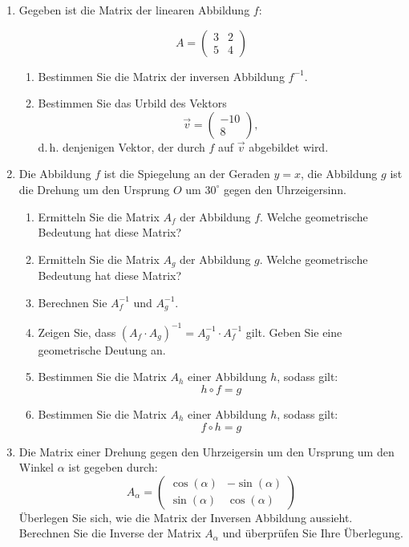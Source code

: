 \begin{ueb}
    {}{}
    \begin{enumerate}
        
    \item Gegeben ist die Matrix der linearen Abbildung \( f \):

    \[
    A = \begin{pmatrix}
    3 & 2 \\
    5 & 4
    \end{pmatrix}
    \]
    
    \begin{enumerate}
      \item Bestimmen Sie die Matrix der inversen Abbildung \( f^{-1} \).
      \item Bestimmen Sie das Urbild des Vektors 
      \[
      \vec{v} = \begin{pmatrix}
      -10 \\
      8
      \end{pmatrix},
      \]
      d.\,h. denjenigen Vektor, der durch \( f \) auf \( \vec{v} \) abgebildet wird.
    \end{enumerate}

    \item Die Abbildung \( f \) ist die Spiegelung an der Geraden \( y = x \),  
    die Abbildung \( g \) ist die Drehung um den Ursprung \( O \) um \( 30^\circ \) gegen den Uhrzeigersinn.
    
    \begin{enumerate}
      \item Ermitteln Sie die Matrix \( A_f \) der Abbildung \( f \). Welche geometrische Bedeutung hat diese Matrix?
      \item Ermitteln Sie die Matrix \( A_g \) der Abbildung \( g \). Welche geometrische Bedeutung hat diese Matrix?
      \item Berechnen Sie \( A_f^{-1} \) und \( A_g^{-1} \).
      \item Zeigen Sie, dass $(A_f \cdot A_g)^{-1} = A_g^{-1} \cdot A_f^{-1}$ gilt. Geben Sie eine geometrische Deutung an.
      \item Bestimmen Sie die Matrix \( A_h \) einer Abbildung \( h \), sodass gilt:
      \[
      h \circ f = g
      \]
      \item Bestimmen Sie die Matrix \( A_h \) einer Abbildung \( h \), sodass gilt:
      \[
      f \circ h = g
      \]
    \end{enumerate}
    \item Die Matrix einer Drehung gegen den Uhrzeigersin um den Ursprung um den Winkel \( \alpha \) ist gegeben durch:
    \[
    A_\alpha = \begin{pmatrix}
    \cos(\alpha) & -\sin(\alpha) \\
    \sin(\alpha) & \cos(\alpha)
    \end{pmatrix}
    \]
    Überlegen Sie sich, wie die Matrix der Inversen Abbildung aussieht. Berechnen Sie die Inverse der Matrix \( A_\alpha \) und überprüfen Sie Ihre Überlegung.
    \end{enumerate}
\end{ueb}


